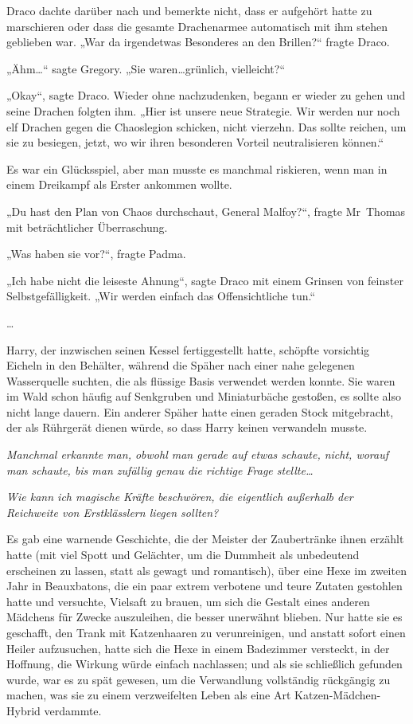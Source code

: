 {Draco dachte darüber nach und bemerkte nicht, dass er aufgehört hatte zu marschieren oder dass die gesamte Drachenarmee automatisch mit ihm stehen geblieben war. „War da irgendetwas Besonderes an den Brillen?“ fragte Draco.

„Ähm…“ sagte Gregory. „Sie waren…grünlich, vielleicht?“

„Okay“, sagte Draco. Wieder ohne nachzudenken, begann er wieder zu gehen und seine Drachen folgten ihm. „Hier ist unsere neue Strategie. Wir werden nur noch elf Drachen gegen die Chaoslegion schicken, nicht vierzehn. Das sollte reichen, um sie zu besiegen, jetzt, wo wir ihren besonderen Vorteil neutralisieren können.“

Es war ein Glücksspiel, aber man musste es manchmal riskieren, wenn man in einem Dreikampf als Erster ankommen wollte.

„Du hast den Plan von Chaos durchschaut, General Malfoy?“, fragte Mr~Thomas mit beträchtlicher Überraschung.

„Was haben sie vor?“, fragte Padma.

„Ich habe nicht die leiseste Ahnung“, sagte Draco mit einem Grinsen von feinster Selbstgefälligkeit. „Wir werden einfach das Offensichtliche tun.“

…

Harry, der inzwischen seinen Kessel fertiggestellt hatte, schöpfte vorsichtig Eicheln in den Behälter, während die Späher nach einer nahe gelegenen Wasserquelle suchten, die als flüssige Basis verwendet werden konnte. Sie waren im Wald schon häufig auf Senkgruben und Miniaturbäche gestoßen, es sollte also nicht lange dauern. Ein anderer Späher hatte einen geraden Stock mitgebracht, der als Rührgerät dienen würde, so dass Harry keinen verwandeln musste.

\emph{Manchmal erkannte man, obwohl man gerade auf etwas schaute, nicht, worauf man schaute, bis man zufällig genau die richtige Frage stellte…}

\emph{Wie kann ich magische Kräfte beschwören, die eigentlich außerhalb der Reichweite von Erstklässlern liegen sollten?}

Es gab eine warnende Geschichte, die der Meister der Zaubertränke ihnen erzählt hatte (mit viel Spott und Gelächter, um die Dummheit als unbedeutend erscheinen zu lassen, statt als gewagt und romantisch), über eine Hexe im zweiten Jahr in Beauxbatons, die ein paar extrem verbotene und teure Zutaten gestohlen hatte und versuchte, Vielsaft zu brauen, um sich die Gestalt eines anderen Mädchens für Zwecke auszuleihen, die besser unerwähnt blieben. Nur hatte sie es geschafft, den Trank mit Katzenhaaren zu verunreinigen, und anstatt sofort einen Heiler aufzusuchen, hatte sich die Hexe in einem Badezimmer versteckt, in der Hoffnung, die Wirkung würde einfach nachlassen; und als sie schließlich gefunden wurde, war es zu spät gewesen, um die Verwandlung vollständig rückgängig zu machen, was sie zu einem verzweifelten Leben als eine Art Katzen-Mädchen-Hybrid verdammte.

}
